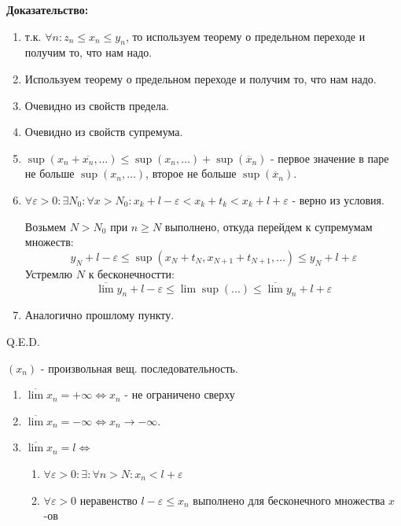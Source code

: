 \textbf{Доказательство:}
\begin{enumerate}
    \item т.к. $\forall n: z_n\leq x_n \leq y_n$, то используем теорему о предельном переходе и получим то, что нам надо.
    \item Используем теорему о предельном переходе и получим то, что нам надо.
    \item Очевидно из свойств предела.
    \item Очевидно из свойств супремума.
    \item $\sup(x_n + \overline{x_n}, \ldots)\leq \sup(x_n,\ldots) + \sup(\overline{x}_n)$ - первое значение в паре не больше $\sup(x_n,\ldots)$, второе не больше $\sup(\overline{x}_n)$.
    \item $\forall \varepsilon >0: \exists N_0: \forall x > N_0: x_k+ l - \varepsilon < x_k + t_k < x_k + l + \varepsilon$ - верно из условия.

    Возьмем $N> N_0$ при $n\geq N$ выполнено, откуда перейдем к супремумам множеств:
    $$y_N + l - \varepsilon \leq \sup (x_N + t_N, x_{N+1} + t_{N+1},\ldots )\leq y_N + l + \varepsilon$$
    Устремлю $N$ к бесконечностти:
    $$\overline{\lim} y_n + l - \varepsilon \leq \lim \sup(...)\leq \overline{\lim} y_n + l + \varepsilon $$
    \item Аналогично прошлому пункту.
\end{enumerate}

\hfill Q.E.D.


$(x_n)$ - произвольная вещ. последовательность.

\begin{enumerate}
    \item $\overline{\lim}x_n = + \infty \Leftrightarrow x_n$ - не ограничено сверху
    \item $\overline{\lim}x_n = - \infty \Leftrightarrow x_n \rightarrow - \infty$.
    \item $\overline{\lim}x_n = l \Leftrightarrow$
    \begin{enumerate}
        \item $\forall \varepsilon >0: \exists :\forall n>N: x_n<l+\varepsilon$
        \item $\forall \varepsilon >0$ неравенство $l-\varepsilon\leq x_n$ выполнено для бесконечного множества $x$-ов
    \end{enumerate}
\end{enumerate}

